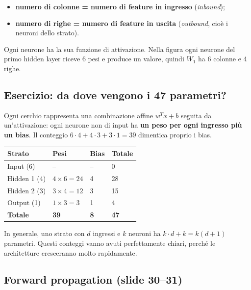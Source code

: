 \documentclass[11pt,a4paper,oneside,openany]{book}
\providecommand{\tightlist}{\setlength{\itemsep}{0pt}\setlength{\parskip}{0pt}}
\begin{document}
\begin{itemize}
\tightlist
\item
  \textbf{numero di colonne = numero di feature in ingresso} (\emph{inbound});
\item
  \textbf{numero di righe = numero di feature in uscita} (\emph{outbound}, cioè i neuroni dello strato).
\end{itemize}

Ogni neurone ha la sua funzione di attivazione. Nella figura ogni neurone del primo hidden layer riceve 6 pesi e produce un valore, quindi \(W_1\) ha 6 colonne e 4 righe.

\subsection{Esercizio: da dove vengono i 47 parametri?}\label{f01-r444}

Ogni cerchio rappresenta una combinazione affine \(w^Tx+b\) seguita da un'attivazione: ogni neurone non di input ha \textbf{un peso per ogni ingresso più un bias}. Il conteggio \(6\cdot4 + 4\cdot3 + 3\cdot1 = 39\) dimentica proprio i bias.

\begin{longtable}[]{@{}llll@{}}
\toprule\noalign{}
Strato & Pesi & Bias & Totale \\
\midrule\noalign{}
\endhead
\bottomrule\noalign{}
\endlastfoot
Input (6) & -- & -- & 0 \\
Hidden 1 (4) & \(4\times6 = 24\) & 4 & 28 \\
Hidden 2 (3) & \(3\times4 = 12\) & 3 & 15 \\
Output (1) & \(1\times3 = 3\) & 1 & 4 \\
\textbf{Totale} & \textbf{39} & \textbf{8} & \textbf{47} \\
\end{longtable}

In generale, uno strato con \(d\) ingressi e \(k\) neuroni ha \(k\cdot d + k = k(d+1)\) parametri. Questi conteggi vanno avuti perfettamente chiari, perché le architetture cresceranno molto rapidamente.

\subsection{Forward propagation (slide 30--31)}\label{f01-r458}
\end{document}
